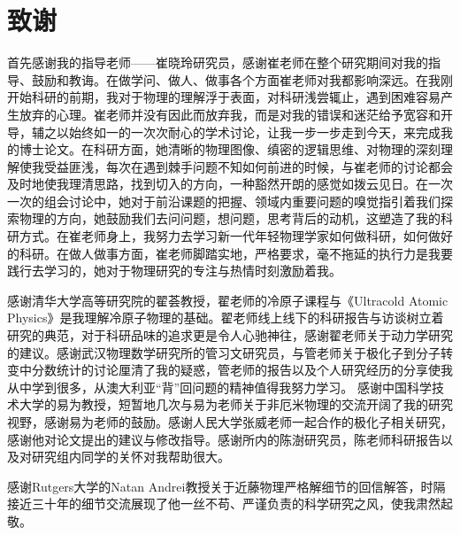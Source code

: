 \chapter[致谢]{致\quad 谢}%

首先感谢我的指导老师——崔晓玲研究员，感谢崔老师在整个研究期间对我的指导、鼓励和教诲。在做学问、做人、做事各个方面崔老师对我都影响深远。在我刚开始科研的前期，我对于物理的理解浮于表面，对科研浅尝辄止，遇到困难容易产生放弃的心理。崔老师并没有因此而放弃我，而是对我的错误和迷茫给予宽容和开导，辅之以始终如一的一次次耐心的学术讨论，让我一步一步走到今天，来完成我的博士论文。在科研方面，她清晰的物理图像、缜密的逻辑思维、对物理的深刻理解使我受益匪浅，每次在遇到棘手问题不知如何前进的时候，与崔老师的讨论都会及时地使我理清思路，找到切入的方向，一种豁然开朗的感觉如拨云见日。在一次一次的组会讨论中，她对于前沿课题的把握、领域内重要问题的嗅觉指引着我们探索物理的方向，她鼓励我们去问问题，想问题，思考背后的动机，这塑造了我的科研方式。在崔老师身上，我努力去学习新一代年轻物理学家如何做科研，如何做好的科研。在做人做事方面，崔老师脚踏实地，严格要求，毫不拖延的执行力是我要践行去学习的，她对于物理研究的专注与热情时刻激励着我。

感谢清华大学高等研究院的翟荟教授，翟老师的冷原子课程与《Ultracold Atomic Physics》是我理解冷原子物理的基础。翟老师线上线下的科研报告与访谈树立着研究的典范，对于科研品味的追求更是令人心驰神往，感谢翟老师关于动力学研究的建议。感谢武汉物理数学研究所的管习文研究员，与管老师关于极化子到分子转变中分数统计的讨论厘清了我的疑惑，管老师的报告以及个人研究经历的分享使我从中学到很多，从澳大利亚“背”回问题的精神值得我努力学习。 感谢中国科学技术大学的易为教授，短暂地几次与易为老师关于非厄米物理的交流开阔了我的研究视野，感谢易为老师的鼓励。感谢人民大学张威老师一起合作的极化子相关研究，感谢他对论文提出的建议与修改指导。感谢所内的陈澍研究员，陈老师科研报告以及对研究组内同学的关怀对我帮助很大。

感谢Rutgers大学的Natan Andrei教授关于近藤物理严格解细节的回信解答，时隔接近三十年的细节交流展现了他一丝不苟、严谨负责的科学研究之风，使我肃然起敬。


